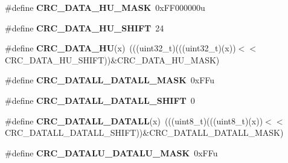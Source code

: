 \begin{DoxyCompactItemize}
\item 
\#define {\bfseries C\+R\+C\+\_\+\+D\+A\+T\+A\+\_\+\+H\+U\+\_\+\+M\+A\+SK}~0x\+F\+F000000u\hypertarget{group__CRC__Register__Masks_ga30fc9246793f0817a1907bc0f9080487}{}\label{group__CRC__Register__Masks_ga30fc9246793f0817a1907bc0f9080487}

\item 
\#define {\bfseries C\+R\+C\+\_\+\+D\+A\+T\+A\+\_\+\+H\+U\+\_\+\+S\+H\+I\+FT}~24\hypertarget{group__CRC__Register__Masks_ga0b68b41e3667c6904623c59fcd3d6c62}{}\label{group__CRC__Register__Masks_ga0b68b41e3667c6904623c59fcd3d6c62}

\item 
\#define {\bfseries C\+R\+C\+\_\+\+D\+A\+T\+A\+\_\+\+HU}(x)~(((uint32\+\_\+t)(((uint32\+\_\+t)(x))$<$$<$C\+R\+C\+\_\+\+D\+A\+T\+A\+\_\+\+H\+U\+\_\+\+S\+H\+I\+FT))\&C\+R\+C\+\_\+\+D\+A\+T\+A\+\_\+\+H\+U\+\_\+\+M\+A\+SK)\hypertarget{group__CRC__Register__Masks_ga618e11d84c3e51f8d767a021dbfc4e94}{}\label{group__CRC__Register__Masks_ga618e11d84c3e51f8d767a021dbfc4e94}

\item 
\#define {\bfseries C\+R\+C\+\_\+\+D\+A\+T\+A\+L\+L\+\_\+\+D\+A\+T\+A\+L\+L\+\_\+\+M\+A\+SK}~0x\+F\+Fu\hypertarget{group__CRC__Register__Masks_ga7f99e19de9e3e19206c47c202c96bb5c}{}\label{group__CRC__Register__Masks_ga7f99e19de9e3e19206c47c202c96bb5c}

\item 
\#define {\bfseries C\+R\+C\+\_\+\+D\+A\+T\+A\+L\+L\+\_\+\+D\+A\+T\+A\+L\+L\+\_\+\+S\+H\+I\+FT}~0\hypertarget{group__CRC__Register__Masks_ga16cc13b7d931b2080c8de506cae34fcb}{}\label{group__CRC__Register__Masks_ga16cc13b7d931b2080c8de506cae34fcb}

\item 
\#define {\bfseries C\+R\+C\+\_\+\+D\+A\+T\+A\+L\+L\+\_\+\+D\+A\+T\+A\+LL}(x)~(((uint8\+\_\+t)(((uint8\+\_\+t)(x))$<$$<$C\+R\+C\+\_\+\+D\+A\+T\+A\+L\+L\+\_\+\+D\+A\+T\+A\+L\+L\+\_\+\+S\+H\+I\+FT))\&C\+R\+C\+\_\+\+D\+A\+T\+A\+L\+L\+\_\+\+D\+A\+T\+A\+L\+L\+\_\+\+M\+A\+SK)\hypertarget{group__CRC__Register__Masks_ga92ae41280f6cede9a6d61d944b9bdbed}{}\label{group__CRC__Register__Masks_ga92ae41280f6cede9a6d61d944b9bdbed}

\item 
\#define {\bfseries C\+R\+C\+\_\+\+D\+A\+T\+A\+L\+U\+\_\+\+D\+A\+T\+A\+L\+U\+\_\+\+M\+A\+SK}~0x\+F\+Fu\hypertarget{group__CRC__Register__Masks_gacf86687293ecef8f5067951339146b2e}{}\label{group__CRC__Register__Masks_gacf86687293ecef8f5067951339146b2e}


\end{DoxyCompactItemize}
